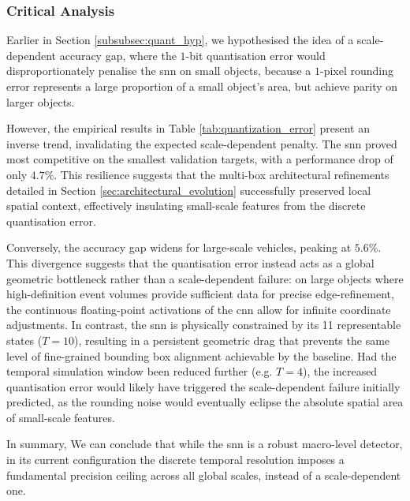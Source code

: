 \subsubsection*{Critical Analysis}

Earlier in Section \ref{subsubsec:quant_hyp}, we hypothesised the idea of a scale-dependent accuracy gap,
where the $1$-bit quantisation error would disproportionately penalise the \gls{snn} on small objects,
because a $1$-pixel rounding error represents a large proportion of a small object's area, but achieve parity on larger objects.

However, the empirical results in Table \ref{tab:quantization_error} present an inverse trend, invalidating the expected scale-dependent penalty.
The \gls{snn} proved most competitive on the smallest validation targets, with a performance drop of only $4.7\%$.
This resilience suggests that the multi-box architectural refinements detailed in Section \ref{sec:architectural_evolution}
successfully preserved local spatial context, effectively insulating small-scale features from the discrete quantisation error.

Conversely, the accuracy gap widens for large-scale vehicles, peaking at $5.6\%$.
This divergence suggests that the quantisation error instead acts as a global geometric bottleneck rather than a scale-dependent failure:
on large objects where high-definition event volumes provide sufficient data for precise edge-refinement,
the continuous floating-point activations of the \gls{cnn} allow for infinite coordinate adjustments.
In contrast, the \gls{snn} is physically constrained by its 11 representable states ($T=10$), 
resulting in a persistent geometric drag that prevents the same level of fine-grained bounding box alignment achievable by the baseline.
Had the temporal simulation window been reduced further (e.g. $T=4$), the increased quantisation error would likely have triggered the scale-dependent failure initially predicted, 
as the rounding noise would eventually eclipse the absolute spatial area of small-scale features.

In summary, We can conclude that while the \gls{snn} is a robust macro-level detector, in its current configuration the discrete temporal resolution
imposes a fundamental precision ceiling across all global scales, instead of a scale-dependent one.
